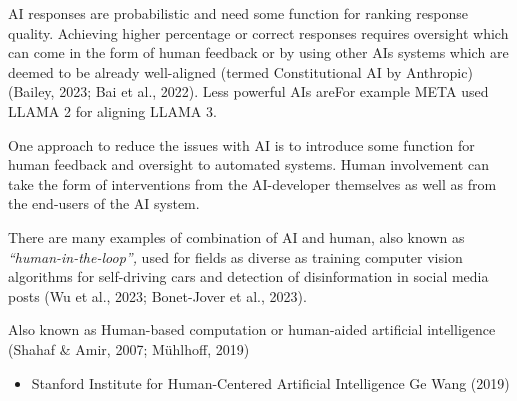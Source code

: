 \documentclass[
  letterpaper,
  DIV=11,
  numbers=noendperiod]{scrartcl}
\providecommand{\tightlist}{%
  \setlength{\itemsep}{0pt}\setlength{\parskip}{0pt}}\usepackage{longtable,booktabs,array}
\begin{document}
AI responses are probabilistic and need some function for ranking
response quality. Achieving higher percentage or correct responses
requires oversight which can come in the form of human feedback or by
using other AIs systems which are deemed to be already well-aligned
(termed Constitutional AI by Anthropic) (Bailey, 2023; Bai et al.,
2022). Less powerful AIs areFor example META used LLAMA 2 for aligning
LLAMA 3.

One approach to reduce the issues with AI is to introduce some function
for human feedback and oversight to automated systems. Human involvement
can take the form of interventions from the AI-developer themselves as
well as from the end-users of the AI system.

There are many examples of combination of AI and human, also known as
\emph{``human-in-the-loop'',} used for fields as diverse as training
computer vision algorithms for self-driving cars and detection of
disinformation in social media posts (Wu et al., 2023; Bonet-Jover et
al., 2023).

Also known as Human-based computation or human-aided artificial
intelligence (Shahaf \& Amir, 2007; Mühlhoff, 2019)

\begin{itemize}
\tightlist
\item
  Stanford Institute for Human-Centered Artificial Intelligence Ge Wang
  (2019)
\end{itemize}
\end{document}
